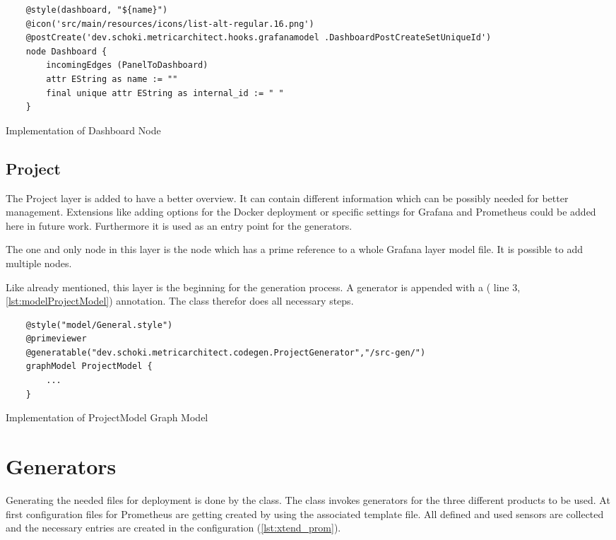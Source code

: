 \begin{listing}[!ht]
	\begin{verbatim}
	@style(dashboard, "${name}")
	@icon('src/main/resources/icons/list-alt-regular.16.png')
	@postCreate('dev.schoki.metricarchitect.hooks.grafanamodel .DashboardPostCreateSetUniqueId')
	node Dashboard {
		incomingEdges (PanelToDashboard)
		attr EString as name := ""
		final unique attr EString as internal_id := " " 
	}
	\end{verbatim}
	\caption{Implementation of Dashboard Node}
	\label{lst:nodeDashboard}
\end{listing}
\subsection{Project}
The Project layer is added to have a better overview. It can contain different information which can be possibly needed for better management. Extensions like adding options for the Docker deployment or specific settings for Grafana and Prometheus could be added here in future work. Furthermore it is used as an entry point for the generators. 

The one and only node in this layer is the  node which has a prime reference to a whole Grafana layer model file. It is possible to add multiple nodes.

Like already mentioned, this layer is the beginning for the generation process. A generator is appended with a  ( line 3, \cref{lst:modelProjectModel}) annotation. The class  therefor does all necessary steps.

\begin{listing}[!ht]
	\begin{verbatim}
	@style("model/General.style")
	@primeviewer
	@generatable("dev.schoki.metricarchitect.codegen.ProjectGenerator","/src-gen/")
	graphModel ProjectModel {
		...
	}
	\end{verbatim}
	\caption{Implementation of ProjectModel Graph Model}
	\label{lst:modelProjectModel}
\end{listing}

\section{Generators}
\label{sec:impl_generator}

Generating the needed files for deployment is done by the  class. The class invokes generators for the three different products to be used. At first configuration files for Prometheus are getting created by  using the associated template file. All defined and used sensors are collected and the necessary entries are created in the configuration (\cref{lst:xtend_prom}).

